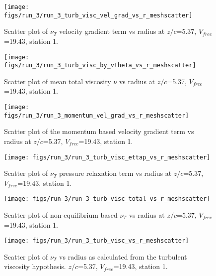 \begin{figure}[H]
\centering
\texttt{[image: figs/run\_3/run\_3\_turb\_visc\_vel\_grad\_vs\_r\_meshscatter]}
\caption{Scatter plot of $\nu_T$ velocity gradient term vs radius at $z/c$=5.37, $V_{free}$=19.43, station 1.}
\end{figure}


\begin{figure}[H]
\centering
\texttt{[image: figs/run\_3/run\_3\_turb\_visc\_by\_vtheta\_vs\_r\_meshscatter]}
\caption{Scatter plot of mean total viscosity $\nu$ vs radius at $z/c$=5.37, $V_{free}$=19.43, station 1.}
\end{figure}


\begin{figure}[H]
\centering
\texttt{[image: figs/run\_3/run\_3\_momentum\_vel\_grad\_vs\_r\_meshscatter]}
\caption{Scatter plot of the momentum based velocity gradient term vs radius at $z/c$=5.37, $V_{free}$=19.43, station 1.}
\end{figure}


\begin{figure}[H]
\centering
\texttt{[image: figs/run\_3/run\_3\_turb\_visc\_ettap\_vs\_r\_meshscatter]}
\caption{Scatter plot of $\nu_T$ pressure relaxation term vs radius at $z/c$=5.37, $V_{free}$=19.43, station 1.}
\end{figure}


\begin{figure}[H]
\centering
\texttt{[image: figs/run\_3/run\_3\_turb\_visc\_total\_vs\_r\_meshscatter]}
\caption{Scatter plot of non-equilibrium based $\nu_T$ vs radius at $z/c$=5.37, $V_{free}$=19.43, station 1.}
\end{figure}


\begin{figure}[H]
\centering
\texttt{[image: figs/run\_3/run\_3\_turb\_visc\_vs\_r\_meshscatter]}
\caption{Scatter plot of $\nu_T$ vs radius as calculated from the turbulent viscosity hypothesis. $z/c$=5.37, $V_{free}$=19.43, station 1.}
\end{figure}


